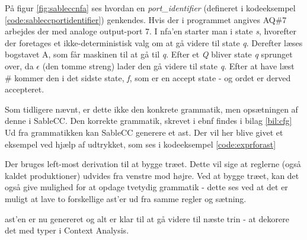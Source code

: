 \noindent På figur \ref{fig:sableccnfa} ses hvordan en \textit{port\_identifier} (defineret i kodeeksempel \ref{code:sableccportidentifier}) genkendes. Hvis der i programmet angives AQ\#7 arbejdes der med analoge output-port 7. I \gls{nfa}'en starter man i state \textit{s}, hvorefter der foretages et ikke-deterministisk valg om at gå videre til state  \textit{q}. Derefter læses bogstavet A, som får maskinen til at gå til \textit{q}. Efter et \textit{Q} bliver state \textit{q} sprunget over, da $\epsilon$ (den tomme streng) lader den gå videre til state \textit{q}. Efter at have læst \# kommer den i det sidste state, \textit{f}, som er en accept state - og ordet er derved accepteret. \\


\noindent Som tidligere nævnt, er dette ikke den konkrete grammatik, men opsætningen af denne i SableCC. Den korrekte grammatik, skrevet i \gls{ebnf} findes i bilag \ref{bil:cfg}\\

\noindent Ud fra grammatikken kan SableCC generere et \gls{ast}. Der vil her blive givet et eksempel ved hjælp af udtrykket, som ses i kodeeksempel \ref{code:exprforast}


\noindent Der bruges left-most derivation til at bygge træet. Dette vil sige at reglerne (også kaldet produktioner) udvides fra venstre mod højre. Ved at bygge træet, kan det også give mulighed for at opdage tvetydig grammatik - dette ses ved at det er muligt at lave to forskellige \gls{ast}'er ud fra samme regler og sætning.


\noindent \gls{ast}'en er nu genereret og alt er klar til at gå videre til næste trin - at dekorere det med typer i Context Analysis.